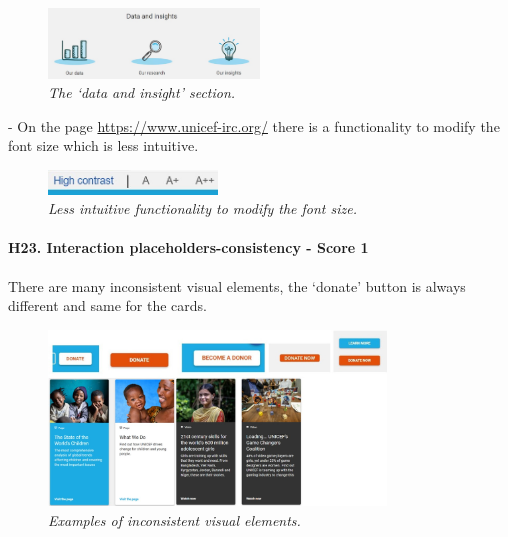 \begin{figure}[!h]
	\begin{center}
		\includegraphics[width=0.5\textwidth]{FinalScores25.jpg}
		\captionsetup{font=small}
		\caption{\textit{The ‘data and insight’ section.}}
	\end{center}
\end{figure}
\newline -	On the page \href{https://www.unicef-irc.org/}{https://www.unicef-irc.org/} there is a functionality to modify the font size which is less intuitive.
\begin{figure}[!h]
	\begin{center}
		\includegraphics[width=0.4\textwidth]{FinalScores26.jpg}
		\captionsetup{font=small}
		\caption{\textit{Less intuitive functionality to modify the font size.}}
	\end{center}
\end{figure}
\newline
\newline \paragraph{H23. Interaction placeholders-consistency - Score 1}  \label{subsec:H23}	There are many inconsistent visual elements, the ‘donate’ button is always different and same for the cards.
\begin{figure}[!h]
	\begin{center}
		\includegraphics[width=0.8\textwidth]{FinalScores27.jpg}
		\captionsetup{font=small}
		\caption{\textit{Examples of inconsistent visual elements.}}
	\end{center}
\end{figure}
